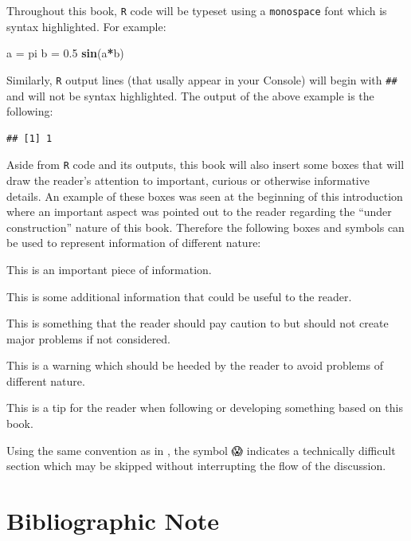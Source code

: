\documentclass[]{book}
\newenvironment{Shaded}{\begin{snugshade}}{\end{snugshade}}
\newcommand{\KeywordTok}[1]{\textcolor[rgb]{0.13,0.29,0.53}{\textbf{#1}}}
\newcommand{\FloatTok}[1]{\textcolor[rgb]{0.00,0.00,0.81}{#1}}
\newcommand{\StringTok}[1]{\textcolor[rgb]{0.31,0.60,0.02}{#1}}
\newcommand{\OperatorTok}[1]{\textcolor[rgb]{0.81,0.36,0.00}{\textbf{#1}}}
\newcommand{\NormalTok}[1]{#1}
\theoremstyle{definition}
\theoremstyle{definition}
\theoremstyle{definition}
\theoremstyle{remark}
\let\BeginKnitrBlock\begin \let\EndKnitrBlock\end
\begin{document}
Throughout this book, \texttt{R} code will be typeset using a
\texttt{monospace} font which is syntax highlighted. For example:

\begin{Shaded}
\begin{Highlighting}[]
\NormalTok{a =}\StringTok{ }\NormalTok{pi}
\NormalTok{b =}\StringTok{ }\FloatTok{0.5}
\KeywordTok{sin}\NormalTok{(a}\OperatorTok{*}\NormalTok{b)}
\end{Highlighting}
\end{Shaded}

Similarly, \texttt{R} output lines (that usally appear in your Console)
will begin with \texttt{\#\#} and will not be syntax highlighted. The
output of the above example is the following:

\begin{verbatim}
## [1] 1
\end{verbatim}

Aside from \texttt{R} code and its outputs, this book will also insert
some boxes that will draw the reader's attention to important, curious
or otherwise informative details. An example of these boxes was seen at
the beginning of this introduction where an important aspect was pointed
out to the reader regarding the ``under construction'' nature of this
book. Therefore the following boxes and symbols can be used to represent
information of different nature:

\BeginKnitrBlock{rmdimportant}
This is an important piece of information.
\EndKnitrBlock{rmdimportant}

\BeginKnitrBlock{rmdnote}
This is some additional information that could be useful to the reader.
\EndKnitrBlock{rmdnote}

\BeginKnitrBlock{rmdcaution}
This is something that the reader should pay caution to but should not
create major problems if not considered.
\EndKnitrBlock{rmdcaution}

\BeginKnitrBlock{rmdwarning}
This is a warning which should be heeded by the reader to avoid problems
of different nature.
\EndKnitrBlock{rmdwarning}

\BeginKnitrBlock{rmdtip}
This is a tip for the reader when following or developing something
based on this book.
\EndKnitrBlock{rmdtip}

Using the same convention as in \citet{friedman2001elements}, the symbol
😱 indicates a technically difficult section which may be skipped without
interrupting the flow of the discussion.

\section{Bibliographic Note}\label{bibliographic-note}
\end{document}
